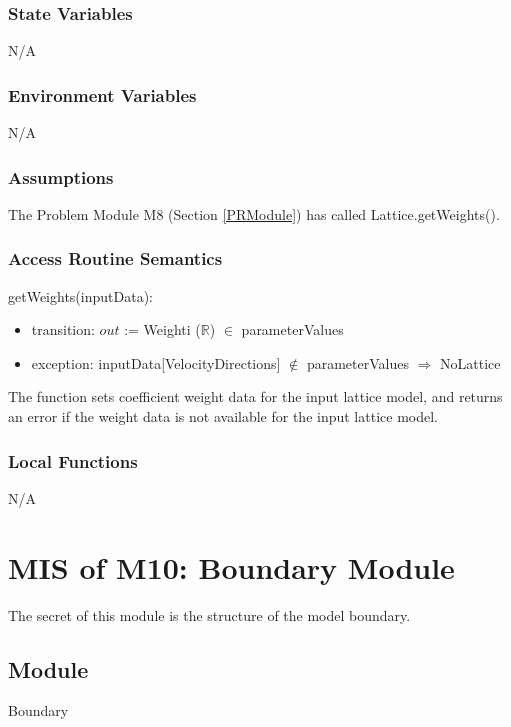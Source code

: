 \documentclass[12pt, titlepage]{article}
\begin{document}
\subsubsection{State Variables}
N/A

\subsubsection{Environment Variables}
N/A

\subsubsection{Assumptions}

The Problem Module M8 (Section \ref{PRModule}) has called Lattice.getWeights().

\subsubsection{Access Routine Semantics}

\noindent getWeights(inputData):
\begin{itemize}
	\item transition: $out$ := Weighti ($\mathbb{R}$) $\in$ parameterValues
	\item exception: inputData[VelocityDirections] $\notin$ parameterValues $\Rightarrow$ NoLattice
\end{itemize}

The function sets coefficient weight data for the input lattice model, and returns an error if the weight data is not available for the input lattice model.

\subsubsection{Local Functions}
N/A

\newpage

\section{MIS of M10: Boundary Module} \label{BOModule}

The secret of this module is the structure of the model boundary.

\subsection{Module}

Boundary
\end{document}
